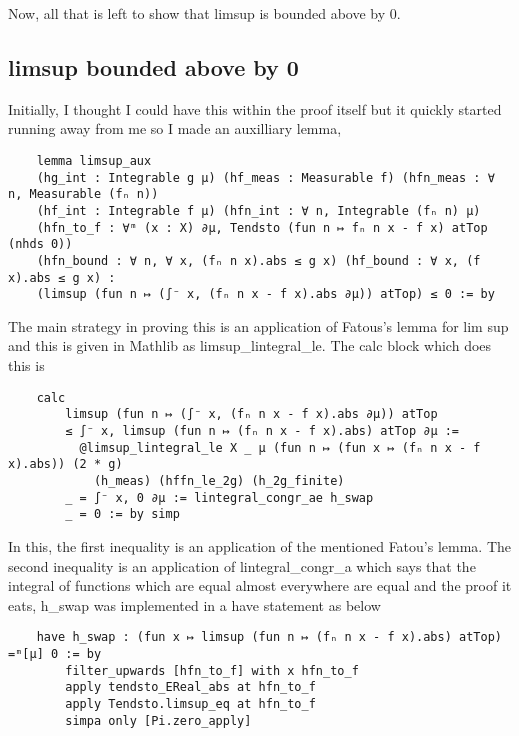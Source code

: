 \documentclass{article}
\renewcommand{\texttt}[1]{{\small\ttfamily #1}}
\begin{document}
Now, all that is left to show that limsup is bounded above by 0.

\subsection*{limsup bounded above by 0}

Initially, I thought I could have this within the proof itself but it quickly started running away from me so I made an auxilliary lemma, 


\begin{verbatim}
    lemma limsup_aux
    (hg_int : Integrable g μ) (hf_meas : Measurable f) (hfn_meas : ∀ n, Measurable (fₙ n))
    (hf_int : Integrable f μ) (hfn_int : ∀ n, Integrable (fₙ n) μ)
    (hfn_to_f : ∀ᵐ (x : X) ∂μ, Tendsto (fun n ↦ fₙ n x - f x) atTop (nhds 0))
    (hfn_bound : ∀ n, ∀ x, (fₙ n x).abs ≤ g x) (hf_bound : ∀ x, (f x).abs ≤ g x) :
    (limsup (fun n ↦ (∫⁻ x, (fₙ n x - f x).abs ∂μ)) atTop) ≤ 0 := by
\end{verbatim}

The main strategy in proving this is an application of Fatous's lemma for lim sup and this is given in Mathlib as \texttt{limsup\_lintegral\_le}. The calc block which does this is

\begin{verbatim}
    calc
        limsup (fun n ↦ (∫⁻ x, (fₙ n x - f x).abs ∂μ)) atTop
        ≤ ∫⁻ x, limsup (fun n ↦ (fₙ n x - f x).abs) atTop ∂μ :=
          @limsup_lintegral_le X _ μ (fun n ↦ (fun x ↦ (fₙ n x - f x).abs)) (2 * g)
            (h_meas) (hffn_le_2g) (h_2g_finite)
        _ = ∫⁻ x, 0 ∂μ := lintegral_congr_ae h_swap
        _ = 0 := by simp
\end{verbatim}

In this, the first inequality is an application of the mentioned Fatou's lemma. The second inequality is an application of \texttt{lintegral\_congr\_a} which says that the integral of functions which are equal almost everywhere are equal and the proof it eats, \texttt{h\_swap} was implemented in a have statement as below

\begin{verbatim}
    have h_swap : (fun x ↦ limsup (fun n ↦ (fₙ n x - f x).abs) atTop) =ᵐ[μ] 0 := by
        filter_upwards [hfn_to_f] with x hfn_to_f
        apply tendsto_EReal_abs at hfn_to_f
        apply Tendsto.limsup_eq at hfn_to_f
        simpa only [Pi.zero_apply]
\end{verbatim}
\end{document}

